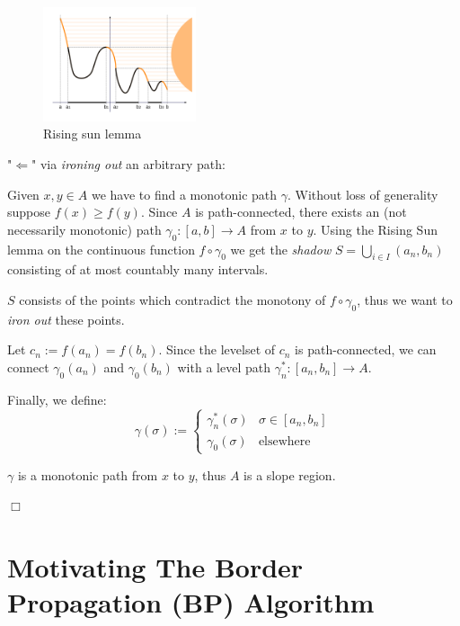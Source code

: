 \documentclass[a4paper,12pt,notitlepage,fullpage]{paper}
\theoremstyle{plain}
\theoremstyle{definition}
\begin{document}
$~$

\begin{figure}
\centering
\includegraphics[width=0.4\textwidth]{img/Rising_sun_lemma.png}
\caption{Rising sun lemma}
\label{fig:lemma_1}
\end{figure}

"$\Leftarrow$" via \emph{ironing out} an arbitrary path:

Given $x, y \in A$ we have to find a monotonic path $\gamma$. Without loss of generality suppose $f(x) \geq f(y)$. Since $A$ is path-connected, there exists an (not necessarily monotonic) path $\gamma_0: [a,b] \to A$ from $x$ to $y$. Using the Rising Sun lemma \cite{grill} on the continuous function $f \circ \gamma_0$ we get the \emph{shadow} $S = \bigcup_{i \in I} (a_n, b_n)$ consisting of at most countably many intervals.

$S$ consists of the points which contradict the monotony of $f \circ \gamma_0$, thus we want to \emph{iron out} these points.

Let $c_n := f(a_n) = f(b_n)$. Since the levelset of $c_n$ is path-connected, we can connect $\gamma_0(a_n)$ and $\gamma_0(b_n)$ with a level path $\gamma_n^* : [a_n, b_n] \to A.$

Finally, we define:
\begin{equation*}
\gamma(\sigma) :=
\begin{cases}
\gamma_n^*(\sigma) & \sigma \in [a_n, b_n] \\
\gamma_0(\sigma) & \text{elsewhere}
\end{cases}
\end{equation*}

$\gamma$ is a monotonic path from $x$ to $y$, thus $A$ is a slope region.

\hfill $\Box$



\section{Motivating The Border Propagation (BP) Algorithm}
\label{sec:motivating_BP}
\end{document}
